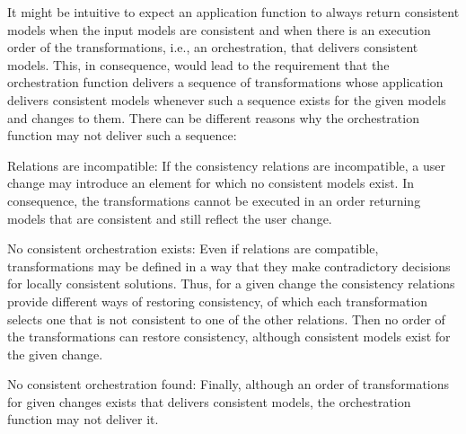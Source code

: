 It might be intuitive to expect an application function to always return consistent models when the input models are consistent and when there is an execution order of the transformations, i.e., an orchestration, that delivers consistent models.
This, in consequence, would lead to the requirement that the orchestration function delivers a sequence of transformations whose application delivers consistent models whenever such a sequence exists for the given models and changes to them.
There can be different reasons why the orchestration function may not deliver such a sequence:
\begin{properdescription}
    \item[Relations are incompatible:] If the consistency relations are incompatible, a user change may introduce an element for which no consistent models exist. In consequence, the transformations cannot be executed in an order returning models that are consistent and still reflect the user change.
    \item[No consistent orchestration exists:] Even if relations are compatible, transformations may be defined in a way that they make contradictory decisions for locally consistent solutions. Thus, for a given change the consistency relations provide different ways of restoring consistency, of which each transformation selects one that is not consistent to one of the other relations.
    Then no order of the transformations can restore consistency, although consistent models exist for the given change.
    \item[No consistent orchestration found:] Finally, although an order of transformations for given changes exists that delivers consistent models, the orchestration function may not deliver it. 
\end{properdescription}

